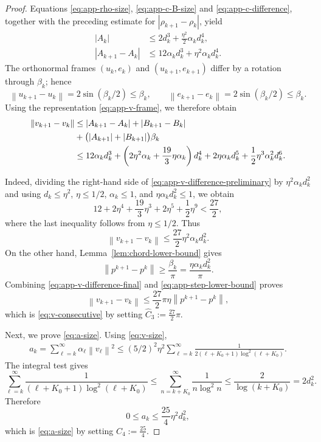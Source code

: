 \documentclass[11pt]{article}
\numberwithin{equation}{section}
\newcommand{\norm}[1]{\left\lVert #1\right\rVert}
\begin{document}
\begin{proof}
Equations \eqref{eq:app-rho-size}, \eqref{eq:app-c-B-size} and
\eqref{eq:app-c-difference}, together with the preceding estimate for $|\rho_{k+1}-\rho_k|$, yield
\begin{align}
    |A_k|
    &\leq 2 d_k^3+\frac{\eta^2}{2}\alpha_kd_k^4,
    \label{eq:app-A-size}\\
    |A_{k+1}-A_k|
    &\leq 12\alpha_kd_k^3
          +\eta^2\alpha_kd_k^4.
    \label{eq:app-A-difference}
\end{align}
The orthonormal frames \((u_k,e_k)\) and
\((u_{k+1},e_{k+1})\) differ by a rotation through \(\beta_k\); hence
\[
    \norm{u_{k+1}-u_k}=2\sin(\beta_k/2)\leq\beta_k,
    \qquad
    \norm{e_{k+1}-e_k}=2\sin(\beta_k/2)\leq\beta_k.
\]
Using the representation \eqref{eq:app-v-frame}, we therefore obtain
\begin{align}
    \norm{v_{k+1}-v_k}
    &\leq |A_{k+1}-A_k|+|B_{k+1}-B_k|\notag\\
    &+\bigl(|A_{k+1}|+|B_{k+1}|\bigr)\beta_k\notag\\
    &\leq 12 \alpha_k d_k^3+\left(2\eta^2\alpha_k+\frac{19}{3}\eta\alpha_k\right)d_k^4+2\eta\alpha_k d_k^5+\frac{1}{2}\eta^3\alpha_k^2d_k^6.
    \label{eq:app-v-difference-preliminary}
\end{align}

Indeed, dividing the right-hand side of \eqref{eq:app-v-difference-preliminary} by
$\eta^2\alpha_kd_k^2$ and using
$d_k\leq\eta^2$, $\eta\leq 1/2$, $\alpha_k\leq 1$, and
$\eta\alpha_kd_k^2\leq 1$, we obtain
\[
    12+2\eta^4+\frac{19}{3}\eta^3+2\eta^5
    +\frac12\eta^9
    <\frac{27}{2},
\]
where the last inequality follows from $\eta\leq 1/2$.
Thus
\begin{equation}
    \norm{v_{k+1}-v_k}
    \leq \frac{27}{2}\eta^2\alpha_kd_k^2.
    \label{eq:app-v-difference-final}
\end{equation}
On the other hand, Lemma~\ref{lem:chord-lower-bound} gives
\begin{equation}
    \norm{p^{k+1}-p^k}
    \geq\frac{\beta_k}{\pi}
    =\frac{\eta\alpha_kd_k^2}{\pi}.
    \label{eq:app-step-lower-bound}
\end{equation}
Combining \eqref{eq:app-v-difference-final} and
\eqref{eq:app-step-lower-bound} proves
\[
    \norm{v_{k+1}-v_k}
    \leq \frac{27}{2}\pi\eta\norm{p^{k+1}-p^k},
\]
which is \eqref{eq:v-consecutive} by setting $\widehat C_3:= \frac{27}{2}\pi$.

\medskip
Next, we prove \eqref{eq:a-size}.
Using \eqref{eq:v-size},
\begin{align*}
    a_k=\sum_{\ell=k}^{\infty}\alpha_\ell\norm{v_\ell}^2\leq (5/2)^2\eta^2
      \sum_{\ell=k}^{\infty}
      \frac{1}{2(\ell+K_0+1)\log^2(\ell+K_0)}.
\end{align*}
The integral test gives
\[
    \sum_{\ell=k}^{\infty}
      \frac{1}{(\ell+K_0+1)\log^2(\ell+K_0)}
      \leq\sum_{n=k+K_0}^{\infty}\frac{1}{n\log^2 n}
    \leq\frac{2}{\log(k+K_0)}
    =2 d_k^2.
\]
Therefore
\[
    0\leq a_k\leq \frac{25}{4} \eta^2d_k^2,
\]
which is \eqref{eq:a-size} by setting $\widehat C_4:=\frac{25}{4} $.
\end{proof}
\end{document}

